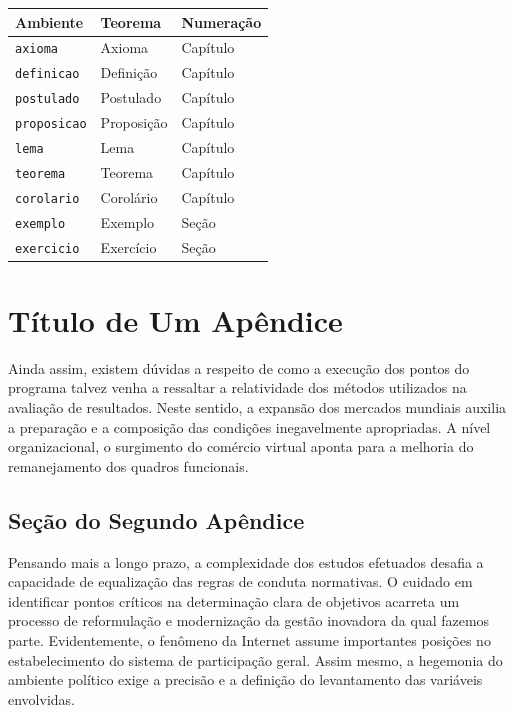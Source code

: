 \documentclass[fleqn]{icat-ufal}
\begin{document}
\begin{spacing}{1}
\begin{longtable}{p{30mm}p{30mm}p{30mm}}   \hline
  Ambiente               & Teorema    & Numeração \\ \hline
  \endhead
  \lstinline!axioma!     & Axioma     & Capítulo  \\
  \lstinline!definicao!  & Definição  & Capítulo  \\
  \lstinline!postulado!  & Postulado  & Capítulo  \\
  \lstinline!proposicao! & Proposição & Capítulo  \\
  \lstinline!lema!       & Lema       & Capítulo  \\
  \lstinline!teorema!    & Teorema    & Capítulo  \\
  \lstinline!corolario!  & Corolário  & Capítulo  \\
  \lstinline!exemplo!    & Exemplo    & Seção     \\
  \lstinline!exercicio!  & Exercício  & Seção     \\ \hline
\end{longtable}

\end{spacing}

\chapter{Título de Um Apêndice}
\label{cap:mais_um_apendice}

Ainda assim, existem dúvidas a respeito de como a execução dos pontos do
programa talvez venha a ressaltar a relatividade dos métodos utilizados na
avaliação de resultados. Neste sentido, a expansão dos mercados mundiais auxilia
a preparação e a composição das condições inegavelmente apropriadas. A nível
organizacional, o surgimento do comércio virtual aponta para a melhoria do
remanejamento dos quadros funcionais. 

\section{Seção do Segundo Apêndice}
\label{sec:secao_do_segundo_apendice}

Pensando mais a longo prazo, a complexidade dos estudos efetuados desafia a
capacidade de equalização das regras de conduta normativas. O cuidado em
identificar pontos críticos na determinação clara de objetivos acarreta um
processo de reformulação e modernização da gestão inovadora da qual fazemos
parte. Evidentemente, o fenômeno da Internet assume importantes posições no
estabelecimento do sistema de participação geral. Assim mesmo, a hegemonia do
ambiente político exige a precisão e a definição do levantamento das variáveis
envolvidas. 
\end{document}
